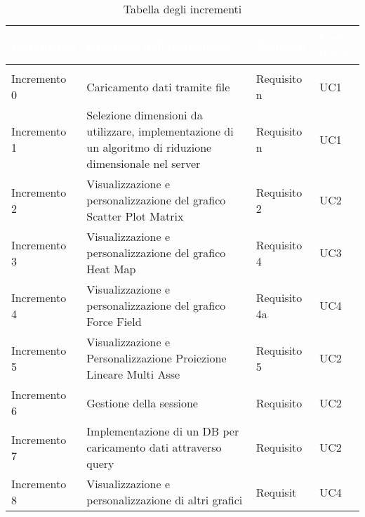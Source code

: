 \begin{longtable}{C{2cm} C{7cm} C{2cm} C{2cm}}
\textcolor{white}{\textbf{Incremento}} & 
\textcolor{white}{\textbf{Obiettivo dell'incremento}} & 
\textcolor{white}{\textbf{Requisiti}} &
\textcolor{white}{\textbf{Casi d'uso}}\\
\endfirsthead
{}\\
\endfoot
{}\caption{Tabella degli incrementi}
\endlastfoot

Incremento 0 & Caricamento dati tramite file & Requisito n & UC1\\
Incremento 1 & Selezione dimensioni da utilizzare, implementazione di un algoritmo di riduzione dimensionale nel server & Requisito n & UC1 \\
Incremento 2 & Visualizzazione e personalizzazione del grafico Scatter Plot Matrix & Requisito 2 & UC2\\
Incremento 3 & Visualizzazione e personalizzazione del grafico Heat Map & Requisito 4 & UC3\\
Incremento 4 & Visualizzazione e personalizzazione del grafico Force Field & Requisito 4a & UC4\\
Incremento 5 & Visualizzazione e Personalizzazione Proiezione Lineare Multi Asse & Requisito 5 & UC2\\
Incremento 6 & Gestione della sessione & Requisito & UC2\\
Incremento 7 & Implementazione di un DB per caricamento dati attraverso query & Requisito & UC2\\
Incremento 8 & Visualizzazione e personalizzazione di altri grafici & Requisit & UC4
\end{longtable}
